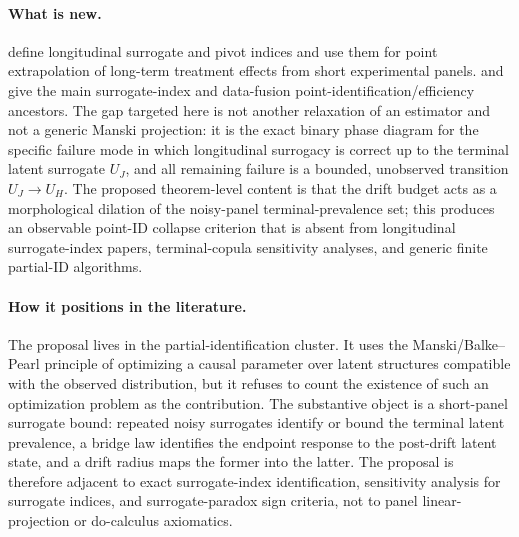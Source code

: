 \documentclass[11pt]{article}
\theoremstyle{definition}
\theoremstyle{plain}
\theoremstyle{remark}
\begin{document}
\paragraph{What is new.}
\citet{HuangWangYuanZhaoZhang2026} define longitudinal surrogate and pivot indices and use them for point extrapolation of long-term treatment effects from short experimental panels.  \citet{AtheyChettyImbensKang2019} and \citet{ChenRitzwoller2023} give the main surrogate-index and data-fusion point-identification/efficiency ancestors.  The gap targeted here is not another relaxation of an estimator and not a generic Manski projection: it is the exact binary phase diagram for the specific failure mode in which longitudinal surrogacy is correct up to the terminal latent surrogate \(U_J\), and all remaining failure is a bounded, unobserved transition \(U_J\to U_H\).  The proposed theorem-level content is that the drift budget acts as a morphological dilation of the noisy-panel terminal-prevalence set; this produces an observable point-ID collapse criterion that is absent from longitudinal surrogate-index papers, terminal-copula sensitivity analyses, and generic finite partial-ID algorithms.

\paragraph{How it positions in the literature.}
The proposal lives in the partial-identification cluster.  It uses the Manski/Balke--Pearl principle of optimizing a causal parameter over latent structures compatible with the observed distribution, but it refuses to count the existence of such an optimization problem as the contribution.  The substantive object is a short-panel surrogate bound: repeated noisy surrogates identify or bound the terminal latent prevalence, a bridge law identifies the endpoint response to the post-drift latent state, and a drift radius maps the former into the latter.  The proposal is therefore adjacent to exact surrogate-index identification, sensitivity analysis for surrogate indices, and surrogate-paradox sign criteria, not to panel linear-projection or do-calculus axiomatics.
\end{document}
